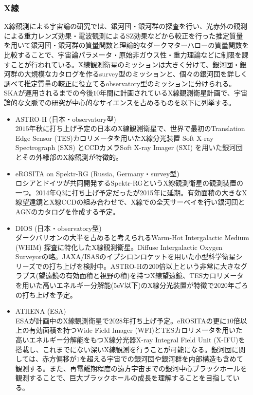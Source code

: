 \subsubsection{X線}
X線観測による宇宙論の研究では、銀河団・銀河群の探査を行い、光赤外の観測による重力レンズ効果・電波観測によるSZ効果などから較正を行った推定質量を用いて銀河団・銀河群の質量関数と理論的なダークマターハローの質量関数を比較することで、宇宙論パラメータ・原始非ガウス性・重力理論などに制限を課すことが行われている。X線観測衛星のミッションは大きく分けて、銀河団・銀河群の大規模なカタログを作るsurvey型のミッションと、個々の銀河団を詳しく調べて推定質量の較正に役立てるobservatory型のミッションに分けられる。SKAが運用されるまでの今後$10$年間に計画されているX線観測衛星計画で、宇宙論的な文脈での研究が中心的なサイエンスを占めるものを以下に列挙する。
\begin{itemize}
\item ASTRO-H (日本・observatory型)\\
$2015$年秋に打ち上げ予定の日本のX線観測衛星で、世界で最初のTranslation Edge Sensor (TES)カロリメータを用いたX線分光装置 Soft X-ray Spectrograph (SXS) とCCDカメラSoft X-ray Imager (SXI) を用いた銀河団とその外縁部のX線観測が特徴的。
\item eROSITA on Spektr-RG (Russia, Germany・survey型)\\
ロシアとドイツが共同開発するSpektr-RGというX線観測衛星の観測装置の一つ。2014年Q3に打ち上げ予定だったが2015年に延期。有効面積の大きなX線望遠鏡とX線CCDの組み合わせで、X線での全天サーベイを行い銀河団とAGNのカタログを作成する予定。
\item DIOS (日本・observatory型)\\
ダークバリオンの大半を占めると考えられるWarm-Hot Intergalactic Medium (WHIM) 探査に特化したX線観測衛星。Diffuse Intergalactic Oxygen Surveyorの略。JAXA/ISASのイプシロンロケットを用いた小型科学衛星シリーズでの打ち上げを検討中。ASTRO-Hの$200$倍以上という非常に大きなグラプス(望遠鏡の有効面積と視野の積)を持つX線望遠鏡、TESカロリメータを用いた高いエネルギー分解能(5eV以下)のX線分光装置が特徴で$2020$年ごろの打ち上げを予定。
\item ATHENA (ESA)\\
ESAが計画中のX線観測衛星で$2028$年打ち上げ予定。eROSITAの更に$10$倍以上の有効面積を持つWide Field Imager (WFI)とTESカロリメータを用いた高いエネルギー分解能をもつX線分光器X-ray Integral Field Unit (X-IFU)を搭載し、これまでにない深いX線観測を行うことが可能になる。銀河団に関しては、赤方偏移が$1$を超える宇宙での銀河団や銀河群を内部構造も含めて観測する。また、再電離期程度の遠方宇宙までの銀河中心ブラックホールを観測することで、巨大ブラックホールの成長を理解することを目指している。
\end{itemize}




